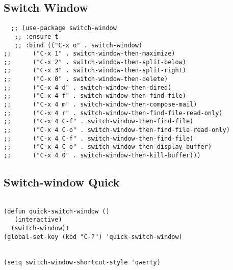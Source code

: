 \documentclass[11pt]{article}
\begin{document}
\subsection{Switch Window}
\label{sec:org6d86768}
\begin{verbatim}
  ;; (use-package switch-window
   ;; :ensure t
   ;; :bind (("C-x o" . switch-window)
;;	    ("C-x 1" . switch-window-then-maximize)
;;	    ("C-x 2" . switch-window-then-split-below)
;;	    ("C-x 3" . switch-window-then-split-right)
;;	    ("C-x 0" . switch-window-then-delete)
;;	    ("C-x 4 d" . switch-window-then-dired)
;;	    ("C-x 4 f" . switch-window-then-find-file)
;;	    ("C-x 4 m" . switch-window-then-compose-mail)
;;	    ("C-x 4 r" . switch-window-then-find-file-read-only)
;;	    ("C-x 4 C-f" . switch-window-then-find-file)
;;	    ("C-x 4 C-o" . switch-window-then-find-file-read-only)
;;	    ("C-x 4 C-f" . switch-window-then-find-file)
;;	    ("C-x 4 C-o" . switch-window-then-display-buffer)
;;	    ("C-x 4 0" . switch-window-then-kill-buffer)))
\end{verbatim}

\subsection{Switch-window Quick}
\label{sec:org3d13beb}

\begin{verbatim}

(defun quick-switch-window ()
   (interactive)
  (switch-window))
(global-set-key (kbd "C-?") 'quick-switch-window)


(setq switch-window-shortcut-style 'qwerty)
\end{verbatim}
\end{document}
